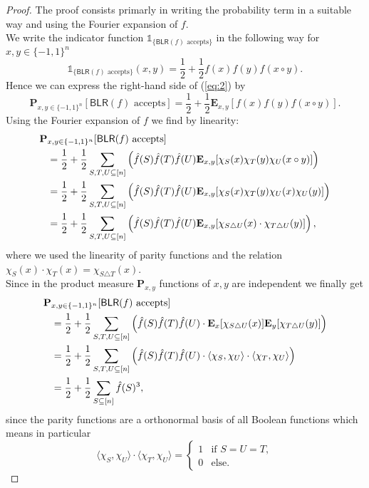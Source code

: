 \documentclass[a4paper]{article}
\newcommand{\prob}{\mathbf{P}}
\newcommand{\expe}{\mathbf{E}}
\newcommand{\nset}{[n]}
\theoremstyle{plain}
\theoremstyle{definition}
\begin{document}
\begin{proof}
  The proof consists primarly in writing the probability term in a
  suitable way and using the Fourier expansion of \(f\). \\
  We write the indicator function \(\mathbb{1}_{\{\textsf{BLR}(f) \text{ accepts}\}}\) in the
  following way for \(x,y \in \{-1,1\}^n\)
  \[\mathbb{1}_{\{\textsf{BLR}(f) \text{ accepts}\}}(x,y) =
  \frac{1}{2} + \frac{1}{2}f(x)f(y)f(x\circ y).\]
  Hence we can express the right-hand side of (\ref{eq:2}) by
  \[\prob_{x,y \in \{-1,1\}^n}[\textsf{BLR}(f) \text{ accepts}] =
  \frac{1}{2} + \frac{1}{2}\expe_{x,y}[f(x)f(y)f(x\circ y)].\]
  Using the Fourier expansion of \(f\) we find by linearity: 
  \begin{align}
    \label{eq:3}
    \prob&_{x,y \in \{-1,1\}^n}[\textsf{BLR}(f) \text{ accepts}] \notag \\ 
    &=  \frac{1}{2} + \frac{1}{2} \sum_{S,T,U \subseteq \nset}\left(\hat{f}(S) \hat{f}(T) \hat{f}(U) \expe_{x,y}[\chi_S(x)\chi_T(y)\chi_U(x\circ y)]\right) \\
    &= \frac{1}{2} + \frac{1}{2} \sum_{S,T,U \subseteq \nset}\left(\hat{f}(S) \hat{f}(T) \hat{f}(U) \expe_{x,y}[\chi_S(x) \chi_T(y) \chi_U(x) \chi_U(y)]\right) \\
    &= \frac{1}{2} + \frac{1}{2} \sum_{S,T,U \subseteq \nset}\left(\hat{f}(S) \hat{f}(T) \hat{f}(U) \expe_{x,y}[\chi_{S\triangle U}(x) \cdot \chi_{T \triangle U}(y)]\right),
  \end{align}
  where we used the linearity of parity functions and the relation
  \(\chi_S(x) \cdot \chi_T(x) = \chi_{S\triangle T}(x)\).\\
  Since in the product measure \(\prob_{x,y}\) functions of \(x,y\)
  are independent we finally get 
  \begin{align}
    \label{eq:4}
    \prob&_{x,y \in \{-1,1\}^n}[\textsf{BLR}(f) \text{ accepts}] \notag \\ 
    &= \frac{1}{2} + \frac{1}{2} \sum_{S,T,U \subseteq \nset}\left(\hat{f}(S) \hat{f}(T) \hat{f}(U) \cdot \expe_x[\chi_{S\triangle U}(x)] \expe_y[\chi_{T \triangle U}(y)]\right) \\
    &= \frac{1}{2} + \frac{1}{2} \sum_{S,T,U \subseteq \nset}\left(\hat{f}(S) \hat{f}(T) \hat{f}(U) \cdot \langle \chi_S, \chi_U \rangle \cdot \langle \chi_T, \chi_U \rangle \right) \\
    &= \frac{1}{2} + \frac{1}{2} \sum_{S \subseteq \nset} \hat{f}(S)^3, 
  \end{align}
  since the parity functions are a orthonormal basis of all Boolean
  functions which means in particular
  \[\langle \chi_S, \chi_U \rangle \cdot \langle \chi_T, \chi_U \rangle = 
  \begin{cases}
    1 & \text{if } S = U = T, \\
    0 & \text{else}.
  \end{cases}
\]
\end{proof}
\end{document}
